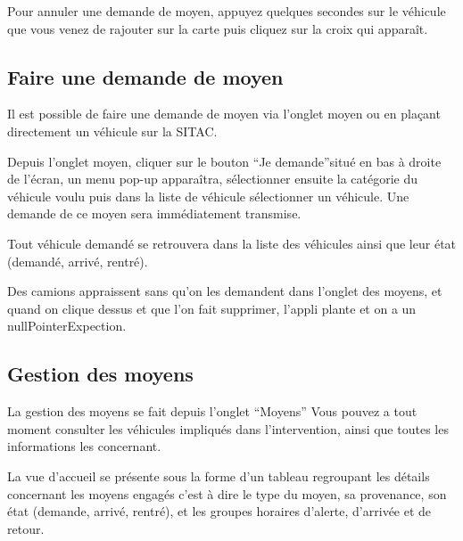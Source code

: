 \documentclass{article}
\begin{document}
\vspace{13pt}
{\color{color01} Pour annuler une demande de moyen, appuyez quelques secondes sur 
le véhicule que vous venez de rajouter sur la carte puis cliquez sur la croix 
qui apparaît.\label{h.qqugtz25i7lm}}

\vspace{31pt}
\subsection*{{\large {\color{color01} \textbf{Faire une demande de moyen}}}}

{\color{color01} Il est possible de faire une demande de moyen via l'onglet moyen 
ou en plaçant directement un véhicule sur la SITAC.}

\vspace{13pt}
{\color{color01} Depuis l'onglet moyen, cliquer sur le bouton ``Je demande''situé 
en bas à droite de l'écran, un menu pop-up apparaîtra, sélectionner ensuite 
la catégorie du véhicule voulu puis dans la liste de véhicule sélectionner 
un véhicule. Une demande de ce moyen sera immédiatement transmise.}

\vspace{13pt}
{\color{color01} Tout véhicule demandé se retrouvera dans la liste des véhicules 
ainsi que leur état (demandé, arrivé, rentré).}

\vspace{13pt}
{\color{color05} Des camions appraissent sans qu'on les demandent dans l'onglet 
des moyens, et quand on clique dessus et que l'on fait supprimer, l'appli plante 
et on a un nullPointerExpection.\label{h.qohgyjd78jua}}

\vspace{18pt}
\subsection*{{\large {\color{color01} \textbf{Gestion des moyens }}}}

\vspace{13pt}
{\color{color01} La gestion des moyens se fait depuis l'onglet ``Moyens'' Vous 
pouvez a tout moment consulter les véhicules impliqués dans l'intervention, ainsi 
que toutes les informations les concernant.}

\vspace{13pt}
{\color{color01} La vue d'accueil se présente sous la forme d'un tableau regroupant 
les détails concernant les moyens engagés c'est à dire le type du moyen, sa 
provenance, son état (demande, arrivé, rentré), et les groupes horaires d'alerte, 
d'arrivée et de retour.}
\end{document}
